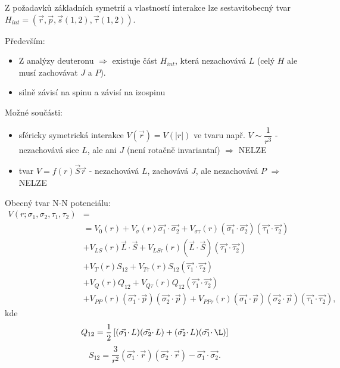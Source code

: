 \documentclass[../../main.tex]{subfiles}
\begin{document}
Z požadavků základních symetrií a vlastností interakce lze sestavit\newline obecný tvar $H_{int} = (\vec{r}, \vec{p}, \vec{s}(1,2), \vec{\tau}(1,2))$.

Především:
\begin{itemize}
	\item Z analýzy deuteronu $\Rightarrow$ existuje část $H_{int}$, která nezachovává $L$ (celý $H$ ale musí zachovávat $J$ a $P$).
	
	\item silně závisí na spinu a závisí na izospinu
\end{itemize}
Možné součásti:
\begin{itemize}
	\item sféricky symetrická interakce $V(\vec{r}) = V(|r|) $ ve tvaru např. $V \sim \dfrac{1}{r^3}$ - nezachovává sice $L$, ale ani $J$ (není rotačně invariantní) $\Rightarrow$ NELZE
	
	\item tvar $V = f(r) \vec{S} \vec{r}$ - nezachovává $L$, zachovává $J$, ale nezachovává $P$ $\Rightarrow$ NELZE
\end{itemize}

Obecný tvar N-N potenciálu:
\begin{equation}
\begin{aligned}
V(r;\sigma_1, \sigma_2, \tau_1, \tau_2) & = \\ 
& = V_0(r) + V_{\sigma} (r) \vec{\sigma_1} \cdotp \vec{\sigma_2} + V_{\sigma \tau} (r) (\vec{\sigma _1} \cdotp \vec{\sigma_2}) (\vec{\tau_1} \cdotp \vec{\tau_2}) \\
& + V_{LS} (r) \vec{L} \cdotp \vec{S} + V_{LS \tau}(r) (\vec{L} \cdotp \vec{S}) (\vec{\tau_1} \cdotp \vec{\tau_2}) \\
& + V_T (r) S_{12} + V_{T \tau} (r) S_{12} (\vec{\tau_1} \cdotp \vec{\tau _2}) \\
& + V_Q(r) Q_{12} + V_{Q \tau} (r) Q_{12} (\vec{\tau_1} \cdotp \vec{\tau _2}) \\
& + V_{PP} (r) (\vec{\sigma _1} \cdotp \vec{p}) (\vec{\sigma_2 } \cdotp \vec{p} ) + V_{PP \tau} (r) (\vec{\sigma _1} \cdotp \vec{p}) (\vec{\sigma_2 } \cdotp \vec{p} )(\vec{\tau_1} \cdotp \vec{\tau_2}),
\end{aligned}
\end{equation}
kde 
\begin{equation}
Q_{12} = \dfrac{1}{2} \left[ (\vec{\sigma_1} \cdotp L) (\vec{\sigma_2} \cdotp L) + (\vec{\sigma_2} \cdotp L) (\vec{\sigma_1} \cdotp \L)\right] 
\end{equation}
\begin{equation}
S_{12} = \dfrac{3}{r^2} (\vec{\sigma_1} \cdotp \vec{r})(\vec{\sigma_2} \cdotp \vec{r}) - \vec{\sigma_1} \cdotp \vec{\sigma_2}.
\end{equation}
\end{document}
